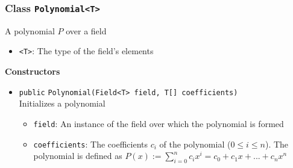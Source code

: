 \subsubsection{Class \lstinline|Polynomial<T>|}
A polynomial $P$ over a field \\



\begin{itemize}
\item \lstinline|<T>|: The type of the field's elements
\end{itemize}


\textbf{Constructors}
\begin{itemize}
\item \lstinline|public| \lstinline|Polynomial|\lstinline|(Field<T> field, T[] coefficients)|\\
Initializes a polynomial
\begin{itemize}
\item \lstinline|field|: An instance of the field over which the polynomial is formed
\item \lstinline|coefficients|: The coefficients $c_i$ of the polynomial ($0 \leq i \leq n$).
 The polynomial is defined as $P(x) := \sum_{i=0}^n c_i x^i = c_0 + c_1
 x + ... + c_n x^n$
\end{itemize}



\end{itemize}


